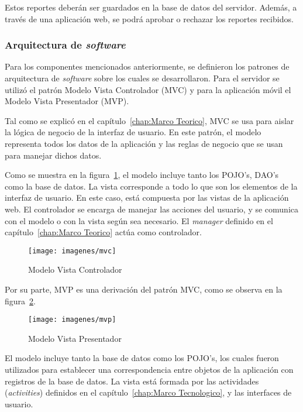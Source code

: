 Estos reportes deberán ser guardados en la base de datos del servidor. Además, a través de una aplicación web, se podrá aprobar o rechazar los reportes recibidos.

\subsubsection{Arquitectura de \textit{software}}

Para los componentes mencionados anteriormente, se definieron los patrones de arquitectura de \textit{software} sobre los cuales se desarrollaron. Para el servidor se utilizó el patrón Modelo Vista Controlador (MVC) y para la aplicación móvil el Modelo Vista Presentador (MVP).

Tal como se explicó en el capítulo~\ref{chap:Marco Teorico}, MVC se usa para aislar la lógica de negocio de la interfaz de usuario. En este patrón, el modelo representa todos los datos de la aplicación y las reglas de negocio que se usan para manejar dichos datos. 

Como se muestra en la figura~\ref{fig:mvc}, el modelo incluye tanto los POJO's, DAO's como la base de datos. La vista corresponde a todo lo que son los elementos de la interfaz de usuario. En este caso, está compuesta por las vistas de la aplicación web. El controlador se encarga de manejar las acciones del usuario, y se comunica con el modelo o con la vista según sea necesario. El \textit{manager} definido en el capítulo~\ref{chap:Marco Teorico} actúa como controlador.

\begin{figure}[ht]
  \centering
  \texttt{[image: imagenes/mvc]}
  \caption{Modelo Vista Controlador}
  \label{fig:mvc}
\end{figure}


Por su parte, MVP es una derivación del patrón MVC, como se observa en la figura~\ref{fig:mvp}.

\begin{figure}[ht]
  \centering
  \texttt{[image: imagenes/mvp]}
  \caption{Modelo Vista Presentador}
  \label{fig:mvp}
\end{figure}

El modelo incluye tanto la base de datos como los POJO's, los cuales fueron utilizados para establecer una correspondencia entre objetos de la aplicación con registros de la base de datos. La vista está formada por las actividades (\textit{activities}) definidos en el capítulo~\ref{chap:Marco Tecnologico}, y las interfaces de usuario.
 
